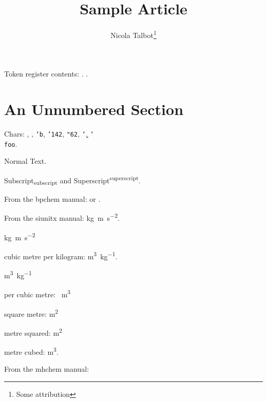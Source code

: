 \documentclass{article}
\title{Sample Article}
\author{Nicola Talbot\thanks{Some attribution}}
\begin{document}
\maketitle

\tableofcontents

\begin{abstract}
\lipsum[1]
\end{abstract}

Token register contents: \the\mytoks.
.

\section*{An Unnumbered Section}

Chars: , \texttt{}, \texttt{\char`b}, \texttt{\char'142},
\texttt{\char"62}, \texttt{\char`\b}, \texttt{\char`\\ foo}.

Normal Text.
\scalebox{2}{Scaled Text}

\lipsum[4-5]

Subscript\textsubscript{subscript} and
Superscript\textsuperscript{superscript}.

From the bpchem manual:
 or .

\bpalpha \bpbeta \bpDelta
\HNMR \CNMR \cis \trans {}

From the siunitx manual:
\si{\kilo\gram\metre\per\square\second}.

\si{kg.m.s^{-2}}

cubic metre per kilogram:
\si{\cubic\metre\per\kilogram}.

\si{m^{3}.kg^{-1}}

per cubic metre: \si{\per\cubic\metre}

square metre: \si{\square\metre}

metre squared: \si{\metre\squared}

metre cubed: \si{\metre\cubed}.

From the mhchem manual:






\end{document}
